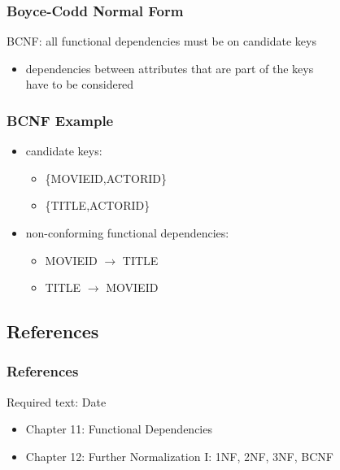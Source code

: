 \documentclass[dvipsnames]{beamer}
\begin{document}
\begin{frame}
  \frametitle{Boyce-Codd Normal Form}

  \begin{definition}
    \alert{BCNF}: all functional dependencies must be on candidate keys
  \end{definition}

  \pause
  \begin{itemize}
    \item dependencies between attributes that are part of the keys\\
      have to be considered
  \end{itemize}
\end{frame}

\begin{frame}
  \frametitle{BCNF Example}

  \begin{example}
    \begin{itemize}
      \item candidate keys:
      \begin{itemize}
        \item \{MOVIEID,ACTORID\}
        \item \{TITLE,ACTORID\}
      \end{itemize}

      \pause
      \item non-conforming functional dependencies:
      \begin{itemize}
        \item MOVIEID $\rightarrow$ TITLE
        \item TITLE $\rightarrow$ MOVIEID
      \end{itemize}
    \end{itemize}
  \end{example}
\end{frame}

\subsection*{References}

\begin{frame}
  \frametitle{References}

  \begin{block}{Required text: Date}
    \begin{itemize}
      \item Chapter 11: \alert{Functional Dependencies}
      \item Chapter 12: \alert{Further Normalization I: 1NF, 2NF, 3NF, BCNF}
    \end{itemize}
  \end{block}
\end{frame}
\end{document}
